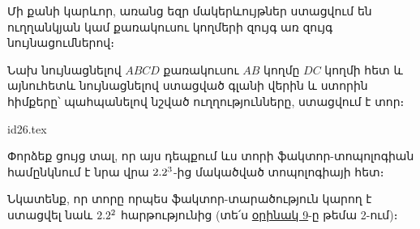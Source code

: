 \documentclass[./main.tex]{subfiles}
\begin{document}
\par Մի քանի կարևոր, առանց եզր մակերևույթներ ստացվում են ուղղանկյան կամ քառակուսու կողմերի զույգ առ զույգ նույնացումներով։


\begin{example}\label{ch12ex5}
Նախ նույնացնելով $ABCD$ քառակուսու $AB$ կողմը $DC$ կողմի հետ և այնուհետև նույնացնելով ստացված գլանի վերին և ստորին հիմքերը՝ պահպանելով նշված ուղղությունները, ստացվում է տոր։

\begin{center}
{id26.tex}
\end{center}
\par Փորձեք ցույց տալ, որ այս դեպքում ևս տորի ֆակտոր-տոպոլոգիան համընկնում է նրա վրա $2.2^3$-ից մակածված տոպոլոգիայի հետ։
\par Նկատենք, որ տորը որպես ֆակտոր-տարածություն կարող է ստացվել նաև $2.2^2$ հարթությունից (տե՛ս \hyperref[ch2ex9]{օրինակ 9}-ը թեմա 2-ում)։
\end{example}


\newpage
\end{document}
